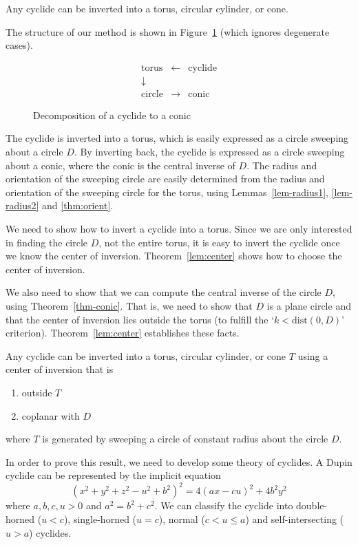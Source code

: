 \begin{lemma}
\label{invert-cyclide}
\cite{DEP84,H52}
Any cyclide can be inverted into a torus, circular cylinder, or cone.
\end{lemma}

The structure of our method is shown in Figure~\ref{fig:box}
(which ignores degenerate cases).
% 
\begin{figure}
\label{fig:box}
\[
\begin{array}{ccc}
\mbox{torus}	&   \leftarrow   & \mbox{cyclide} \\
\downarrow \\
\mbox{circle}	&   \rightarrow   & \mbox{conic}
\end{array}
\]
\caption{Decomposition of a cyclide to a conic}
\end{figure}
%
The cyclide is inverted into a torus, 
which is easily expressed as a circle sweeping about a circle $D$.
By inverting back, the cyclide is expressed as a circle sweeping
about a conic, where the conic is the central inverse of $D$.
The radius and orientation of the sweeping circle are easily 
determined from the radius and orientation of the sweeping circle for
the torus, using Lemmas~\ref{lem-radius1}, \ref{lem-radius2} and 
\ref{thm:orient}.

We need to show how to invert a cyclide into a torus.
Since we are only interested in finding the circle $D$, 
not the entire torus, it is easy to invert the cyclide once we
know the center of inversion.
Theorem~\ref{lem:center} shows how to choose the center of inversion.

We also need to show that we can compute the central inverse of the circle
$D$, using Theorem~\ref{thm-conic}.
That is, we need to show that $D$ is a plane circle and that the center of
inversion lies outside the torus (to fulfill the `$k < \mbox{dist}(0,D)$'
criterion).
Theorem~\ref{lem:center} establishes these facts.

\begin{theorem}
\label{lem:center}
Any cyclide can be inverted into a torus, circular cylinder, or cone $T$
using a center of inversion that is
\begin{enumerate}
\item
	outside $T$
\item
	coplanar with $D$
\end{enumerate}
where $T$ is generated by sweeping a circle 
of constant radius about the circle $D$.
\end{theorem}
In order to prove this result, we need to develop some theory of cyclides.
A Dupin cyclide can be represented by the implicit equation
\[ 
(x^{2} + y^{2} + z^{2} - u^{2} + b^{2})^{2} = 4(ax-cu)^{2} + 4b^{2}y^{2}
\] 
where $a,b,c,u > 0$ and $a^{2} = b^{2} + c^{2}$.
We can classify the cyclide into double-horned ($u < c$), 
single-horned ($u=c$), normal ($c < u \leq a$) and self-intersecting
($u > a$) cyclides.

